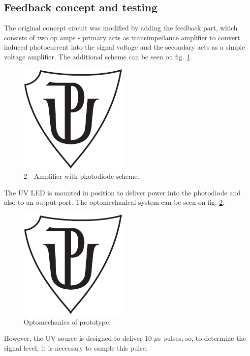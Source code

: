 \subsection{Feedback concept and testing}

The original concept circuit was modified by adding the feedback part, which consists of two op amps - primary acts as transimpedance amplifier to convert induced photocurrent into the signal voltage and the secondary acts as a simple voltage amplifier. The additional scheme can be seen on fig. \ref{Amplifier}.
   
\begin{figure}[H]
 \centering
 \includegraphics[scale=0.5]{up_logo_bw}
 \caption{2 - Amplifier with photodiode scheme.}
 \label{Amplifier}
\end{figure}

The UV LED is mounted in position to deliver power into the photodiode and also to an output port. The optomechanical system can be seen on fig. \ref{Optomechanics}.

\begin{figure}[H]
 \centering
 \includegraphics[scale=0.5]{up_logo_bw}
 \caption{Optomechanics of prototype.}
 \label{Optomechanics}
\end{figure}


However, the UV source is designed to deliver 10 $\mu$s pulses, so, to determine the signal level, it is necessary to sample this pulse. 

